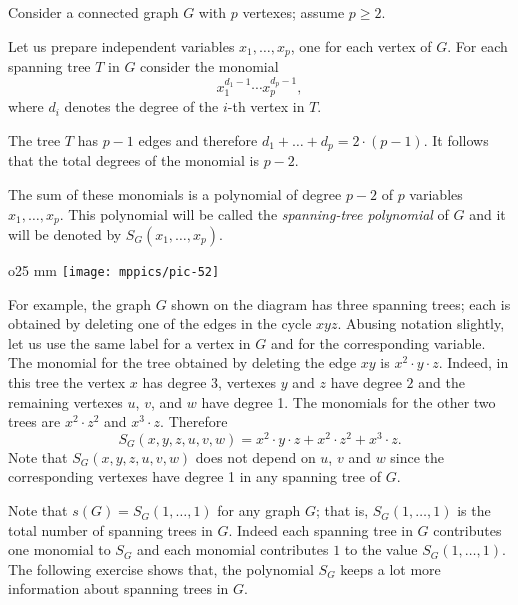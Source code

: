 Consider a connected graph $G$ with $p$ vertexes;
assume $p\ge 2$.

Let us prepare independent variables $x_1,\dots,x_p$, one for each vertex of $G$.
For each spanning tree $T$ in $G$ consider the monomial 
\[x_1^{d_1-1}\cdots x_p^{d_p-1},\]
where $d_i$ denotes the degree of the $i$-th vertex in $T$.

The tree $T$ has $p-1$ edges and therefore 
$d_1+\dots+d_p=2\cdot(p-1)$.
It follows that the total degrees of the monomial is $p-2$.

The sum of these monomials is a polynomial of degree $p-2$ of $p$ variables $x_1,\dots, x_p$.
This polynomial will be called the \emph{spanning-tree polynomial} of $G$ and it will be denoted by 
$S_G(x_1,\dots,x_p)$.

\begin{wrapfigure}{o}{25 mm}
\vskip-0mm
\centering
\texttt{[image: mppics/pic-52]}
\vskip-0mm
\end{wrapfigure}

For example, the graph $G$ shown on the diagram has three spanning trees; each is obtained by deleting one of the edges in the cycle $xyz$.
Abusing notation slightly, let us use the same label for a vertex in $G$ and for the corresponding variable.
The monomial for the tree obtained by deleting the edge $xy$ is $x^2\cdot y\cdot z$.
Indeed, in this tree the vertex $x$ has degree 3, vertexes $y$ and $z$ have degree $2$ and the remaining vertexes $u$, $v$, and $w$ have degree 1.
The monomials for the other two trees are $x^2\cdot z^2$ and $x^3\cdot z$.
Therefore 
\[S_G(x,y,z,u,v,w)= x^2\cdot y\cdot z+x^2\cdot z^2+x^3\cdot z.\]
Note that $S_G(x,y,z,u,v,w)$ does not depend on $u$, $v$ and $w$ since the corresponding vertexes have degree 1 in any spanning tree of $G$.


Note that $s(G)=S_G(1,\dots,1)$ for any graph $G$; that is, $S_G(1,\dots,1)$ is the total number of spanning trees in $G$.
Indeed each spanning tree in $G$ contributes one monomial to $S_G$ and each monomial contributes $1$ to the value $S_G(1,\dots,1)$.
The following exercise shows that,
the polynomial $S_G$ keeps a lot more information about spanning trees in $G$.   


